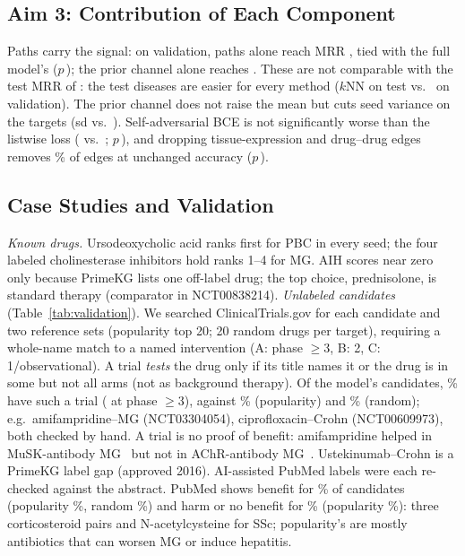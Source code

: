 \documentclass{svproc}
\begin{document}
\subsection{Aim 3: Contribution of Each Component}
Paths carry the signal: on validation, paths alone reach MRR \PathsValidMrr{}, tied with the full model's \MainValidMrr{} ($p$\,\PwilMainPathsValid); the prior channel alone reaches \PriorValidMrr. These are not comparable with the test MRR of \TestMrr{}: the test diseases are easier for every method ($k$NN \KnnTestMrr{} on test vs.\ \KnnValidMrr{} on validation). The prior channel does not raise the mean but cuts seed variance on the targets (sd \MainTargetsMrrSd{} vs.\ \PathsTargetsMrrSd). Self-adversarial BCE is not significantly worse than the listwise loss (\BceValidMrr{} vs.\ \MainValidMrr; $p$\,\PwilMainBceValid), and dropping tissue-expression and drug--drug edges removes \BrgEdgeCutPct\% of edges at unchanged accuracy ($p$\,\PwilMainBrgValid).

\subsection{Case Studies and Validation}
\emph{Known drugs.} Ursodeoxycholic acid ranks first for PBC in every seed; the four labeled cholinesterase inhibitors hold ranks 1--4 for MG. AIH scores near zero only because PrimeKG lists one off-label drug; the top choice, prednisolone, is standard therapy (comparator in NCT00838214).
\emph{Unlabeled candidates} (Table~\ref{tab:validation}). We searched ClinicalTrials.gov for each candidate and two reference sets (popularity top 20; 20 random drugs per target), requiring a whole-name match to a named intervention (A: phase $\geq$3, B: 2, C: 1/observational). A trial \emph{tests} the drug only if its title names it or the drug is in some but not all arms (not as background therapy). Of the model's candidates, \ValTrialTestedModel\% have such a trial (\ValGradeATested{} at phase $\geq$3), against \ValTrialTestedPop\% (popularity) and \ValTrialTestedRand\% (random); e.g.\ amifampridine--MG (NCT03304054), ciprofloxacin--Crohn (NCT00609973), both checked by hand. A trial is no proof of benefit: amifampridine helped in MuSK-antibody MG~\citep{bonanno2018amifampridine} but not in AChR-antibody MG~\citep{remijn2026amifampridine}. Ustekinumab--Crohn is a PrimeKG label gap (approved 2016). AI-assisted PubMed labels were each re-checked against the abstract. PubMed shows benefit for \ValLitSupModel\% of candidates (popularity \ValLitSupPop\%, random \ValLitSupRand\%) and harm or no benefit for \ValLitAgainstModel\% (popularity \ValLitAgainstPop\%): three corticosteroid pairs and N-acetylcysteine for SSc; popularity's are mostly antibiotics that can worsen MG or induce hepatitis.
\end{document}
